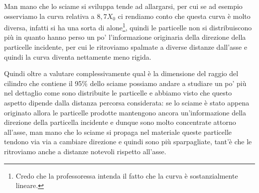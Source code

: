 Man mano che lo sciame si sviluppa tende ad allargarsi, per cui se ad esempio osserviamo la curva relativa a $8,7X_0$ ci rendiamo conto che questa curva è molto diversa, infatti si ha una sorta di alone\footnote{Credo che la professoressa intenda il fatto che la curva è sostanzialmente lineare.}, quindi le particelle non si distribuiscono più in quanto hanno perso un po' l'informazione originaria della direzione della particelle incidente, per cui le ritroviamo spalmate a diverse distanze dall'asse e quindi la curva diventa nettamente meno rigida.

Quindi oltre a valutare complessivamente qual è la dimensione del raggio del cilindro che contiene il 95\% dello sciame possiamo andare a studiare un po' più nel dettaglio come sono distribuite le particelle e abbiamo visto che questo aspetto dipende dalla distanza percorsa considerata: se lo sciame è stato appena originato allora le particelle prodotte mantengono ancora un'informazione della direzione della particella incidente e dunque sono molto concentrate attorno all'asse, man mano che lo sciame si propaga nel materiale queste particelle tendono via via a cambiare direzione e quindi sono più sparpagliate, tant'è che le ritroviamo anche a distanze notevoli rispetto all'asse.

